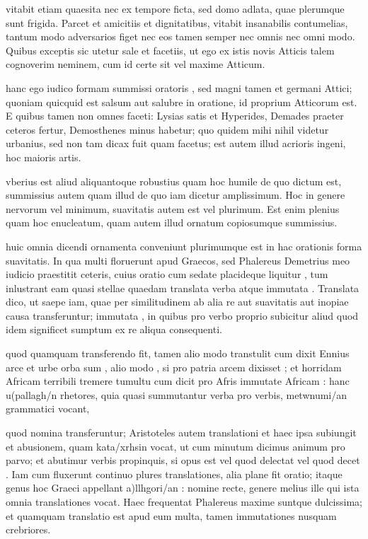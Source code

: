  vitabit etiam quaesita nec ex tempore ficta, sed domo adlata, quae plerumque sunt frigida. Parcet et amicitiis et dignitatibus, vitabit insanabilis contumelias, tantum modo adversarios figet nec eos tamen semper nec omnis nec omni modo. Quibus exceptis sic utetur sale et facetiis, ut ego ex istis novis Atticis talem cognoverim neminem, cum id certe sit vel maxime Atticum.

 hanc ego iudico formam summissi oratoris , sed magni tamen et germani Attici; quoniam quicquid est salsum aut salubre in oratione, id proprium Atticorum est. E quibus tamen non omnes faceti: Lysias satis et Hyperides, Demades praeter ceteros fertur, Demosthenes minus habetur; quo quidem mihi nihil videtur urbanius, sed non tam dicax fuit quam facetus; est autem illud acrioris ingeni, hoc maioris artis.

 vberius est aliud aliquantoque robustius quam hoc humile de quo dictum est, summissius autem quam illud de quo iam dicetur amplissimum. Hoc in genere nervorum vel minimum, suavitatis autem est vel plurimum. Est enim plenius quam hoc enucleatum, quam autem illud ornatum copiosumque summissius.

 huic omnia dicendi ornamenta conveniunt plurimumque est in hac orationis forma suavitatis. In qua multi floruerunt apud Graecos, sed Phalereus Demetrius meo iudicio praestitit ceteris, cuius oratio cum sedate placideque liquitur , tum inlustrant eam quasi stellae quaedam translata verba atque immutata . Translata dico, ut saepe iam, quae per similitudinem ab alia re aut suavitatis aut inopiae causa transferuntur; immutata , in quibus pro verbo proprio subicitur aliud quod idem significet sumptum ex re aliqua consequenti.

 quod quamquam transferendo fit, tamen alio modo transtulit cum dixit Ennius arce et urbe orba sum , alio modo , si pro patria arcem dixisset ; et horridam Africam terribili tremere tumultu cum dicit pro Afris immutate Africam : hanc u(pallagh/n rhetores, quia quasi summutantur verba pro verbis, metwnumi/an grammatici vocant,

 quod nomina transferuntur; Aristoteles autem translationi et haec ipsa subiungit et abusionem, quam kata/xrhsin vocat, ut cum minutum dicimus animum pro parvo; et abutimur verbis propinquis, si opus est vel quod delectat vel quod decet . Iam cum fluxerunt continuo plures translationes, alia plane fit oratio; itaque genus hoc Graeci appellant a)llhgori/an : nomine recte, genere melius ille qui ista omnia translationes vocat. Haec frequentat Phalereus maxime suntque dulcissima; et quamquam translatio est apud eum multa, tamen immutationes nusquam crebriores.


